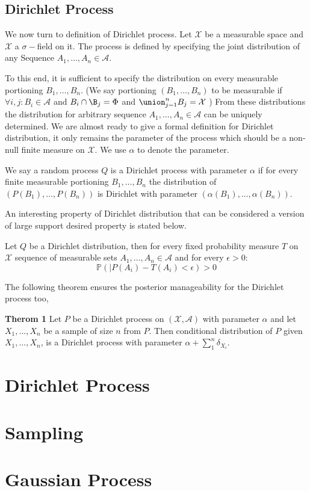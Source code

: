 \documentclass{article}
\begin{document}
\subsection{Dirichlet Process}
We now turn to definition of Dirichlet process. Let $ \mathcal{X}$  be a measurable space
and $ \mathcal{X} $  a $\sigma-$field on it. The process is defined by specifying the joint distribution of any
Sequence $A_1, \ldots, A_n \in \mathcal{A}$.

To this end, it is sufficient to specify the distribution on every measurable portioning $B_1, \ldots, B_n$.
(We say portioning $(B_1, \ldots, B_n)$ to be measurable if $\forall i,j: B_i \in \mathcal{A}$ and $B_i \cap \B_j = \Phi$ and $\union_{j=1}^n B_j = \mathcal{X}$ )
From these distributions the distribution for arbitrary sequence $A_1, \ldots, A_n \in \mathcal{A}$ can be uniquely determined.
We are almost ready to give a formal definition for Dirichlet distribution, it only remains
the parameter of the process which should be a non-null finite measure on $\mathcal{X}$. We use $\alpha$ to denote the parameter.

We say a random process $Q$ is a Dirichlet process with parameter $\alpha$ if for every finite measurable portioning $B_1, \ldots, B_n$
the distribution of $(P(B_1), \ldots, P(B_n))$ is  Dirichlet with parameter $(\alpha(B_1), \ldots, \alpha(B_n))$.

An interesting property of Dirichlet distribution that can be considered a version of large support desired property is stated below.

Let $Q$ be a Dirichlet distribution, then for every fixed probability measure $T$ on $\mathcal{X}$ sequence of measurable sets
$A_1, \ldots, A_n \in \mathcal{A}$ and for every $\epsilon > 0$:
\begin{equation}
  \mathbb{P}(|P(A_i) - T(A_i) <\epsilon) > 0
\end{equation}

The following theorem ensures the posterior manageability for the Dirichlet process too,

\textbf{Therom 1} Let $P$ be a Dirichlet process on $(\mathcal{X},\mathcal{A})$ with parameter $\alpha $ and let $X_1,\ldots, X_n$
be a sample of size $n$ from $P$.
Then conditional distribution of $P$ given $ X_1, \ldots , X_n$, is a Dirichlet process with parameter $\alpha + \sum_{1}^n \delta_{X_i}$.




\section{Dirichlet Process}

\section{Sampling}

\section{Gaussian Process}
\end{document}
